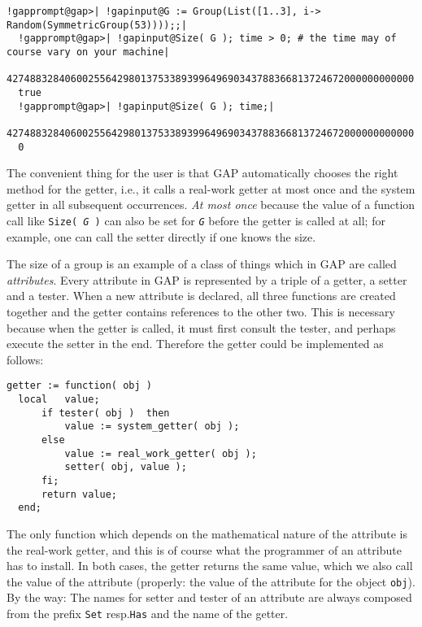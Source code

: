 \documentclass[a4paper,11pt]{report}
\begin{document}
{{ 
\begin{Verbatim}[commandchars=!@|,fontsize=\small,frame=single,label=Example]
  !gapprompt@gap>| !gapinput@G := Group(List([1..3], i-> Random(SymmetricGroup(53))));;|
  !gapprompt@gap>| !gapinput@Size( G ); time > 0; # the time may of course vary on your machine|
  4274883284060025564298013753389399649690343788366813724672000000000000
  true
  !gapprompt@gap>| !gapinput@Size( G ); time;|
  4274883284060025564298013753389399649690343788366813724672000000000000
  0
\end{Verbatim}
 

 The convenient thing for the user is that \textsf{GAP} automatically chooses the right method for the getter, i.e., it calls a
real-work getter at most once and the system getter in all subsequent
occurrences. \emph{At most once} because the value of a function call like \texttt{Size( \mbox{\texttt{\mdseries\slshape G}} )} can also be set for \mbox{\texttt{\mdseries\slshape G}} before the getter is called at all; for example, one can call the setter
directly if one knows the size. 

 The size of a group is an example of a class of things which in \textsf{GAP} are called \emph{attributes}. Every attribute in \textsf{GAP} is represented by a triple of a getter, a setter and a tester. When a new
attribute is declared, all three functions are created together and the getter
contains references to the other two. This is necessary because when the
getter is called, it must first consult the tester, and perhaps execute the
setter in the end. Therefore the getter could be implemented as follows: 
\begin{Verbatim}[commandchars=!@|,fontsize=\small,frame=single,label=Example]
  getter := function( obj )
  local   value;
      if tester( obj )  then
          value := system_getter( obj );
      else
          value := real_work_getter( obj );
          setter( obj, value );
      fi;
      return value;
  end;
\end{Verbatim}
 The only function which depends on the mathematical nature of the attribute is
the real-work getter, and this is of course what the programmer of an
attribute has to install. In both cases, the getter returns the same value,
which we also call the value of the attribute (properly: the value of the
attribute for the object \texttt{obj}). By the way: The names for setter and tester of an attribute are always
composed from the prefix \texttt{Set} resp.{\nobreakspace}\texttt{Has} and the name of the getter. 

}}
\end{document}
